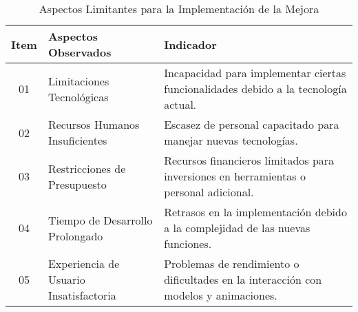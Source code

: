 \begin{table}[!ht]
\centering
\begin{tabular}{|c|p{4cm}|p{7cm}|}
\hline
\textbf{Item} & \textbf{Aspectos Observados} & \textbf{Indicador} \\
\hline
01 & Limitaciones Tecnológicas & Incapacidad para implementar ciertas funcionalidades debido a la tecnología actual. \\ \hline
02 & Recursos Humanos Insuficientes & Escasez de personal capacitado para manejar nuevas tecnologías. \\ \hline
03 & Restricciones de Presupuesto & Recursos financieros limitados para inversiones en herramientas o personal adicional. \\ \hline
04 & Tiempo de Desarrollo Prolongado & Retrasos en la implementación debido a la complejidad de las nuevas funciones. \\ \hline
05 & Experiencia de Usuario Insatisfactoria & Problemas de rendimiento o dificultades en la interacción con modelos y animaciones. \\  \hline
\end{tabular}
\caption{Aspectos Limitantes para la Implementación de la Mejora}
\end{table}
